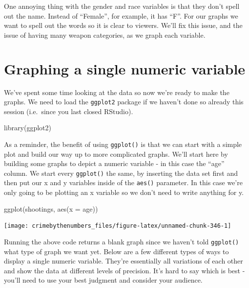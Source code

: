 \documentclass[
  a4paper,
]{krantz}
\makeatletter
\newenvironment{Shaded}{\begin{snugshade}}{\end{snugshade}}
\newcommand{\AttributeTok}[1]{\textcolor[rgb]{0.61,0.61,0.61}{#1}}
\newcommand{\FunctionTok}[1]{\textcolor[rgb]{0,0,0}{#1}}
\newcommand{\NormalTok}[1]{#1}
\newenvironment{kframe}{%
\medskip{}
\setlength{\fboxsep}{.8em}
 \def\at@end@of@kframe{}%
 \ifinner\ifhmode%
  \def\at@end@of@kframe{\end{minipage}}%
  \begin{minipage}{\columnwidth}%
 \fi\fi%
 \def\FrameCommand##1{\hskip\@totalleftmargin \hskip-\fboxsep
 \colorbox{shadecolor}{##1}\hskip-\fboxsep
     \hskip-\linewidth \hskip-\@totalleftmargin \hskip\columnwidth}%
 \MakeFramed {\advance\hsize-\width
   \@totalleftmargin\z@ \linewidth\hsize
   \@setminipage}}%
 {\par\unskip\endMakeFramed%
 \at@end@of@kframe}
\renewenvironment{Shaded}{\begin{kframe}}{\end{kframe}}
\makeatother
\begin{document}
One annoying thing with the gender and race variables is
that they don't spell out the name. Instead of ``Female'',
for example, it has ``F''. For our graphs we want to spell
out the words so it is clear to viewers. We'll fix this
issue, and the issue of having many weapon categories, as we
graph each variable.

\hypertarget{graphing-a-single-numeric-variable}{%
\section{Graphing a single numeric
variable}\label{graphing-a-single-numeric-variable}}

We've spent some time looking at the data so now we're ready
to make the graphs. We need to load the \texttt{ggplot2}
package if we haven't done so already this session
(i.e.~since you last closed RStudio).

\begin{Shaded}
\begin{Highlighting}[]
\FunctionTok{library}\NormalTok{(ggplot2)}
\end{Highlighting}
\end{Shaded}

As a reminder, the benefit of using \texttt{ggplot()} is
that we can start with a simple plot and build our way up to
more complicated graphs. We'll start here by building some
graphs to depict a numeric variable - in this case the
``age'' column. We start every \texttt{ggplot()} the same,
by inserting the data set first and then put our x and y
variables inside of the \texttt{aes()} parameter. In this
case we're only going to be plotting an x variable so we
don't need to write anything for y.

\begin{Shaded}
\begin{Highlighting}[]
\FunctionTok{ggplot}\NormalTok{(shootings, }\FunctionTok{aes}\NormalTok{(}\AttributeTok{x =}\NormalTok{ age))}
\end{Highlighting}
\end{Shaded}

\begin{center}\texttt{[image: crimebythenumbers\_files/figure-latex/unnamed-chunk-346-1]} \end{center}

Running the above code returns a blank graph since we
haven't told \texttt{ggplot()} what type of graph we want
yet. Below are a few different types of ways to display a
single numeric variable. They're essentially all variations
of each other and show the data at different levels of
precision. It's hard to say which is best - you'll need to
use your best judgment and consider your audience.
\end{document}
